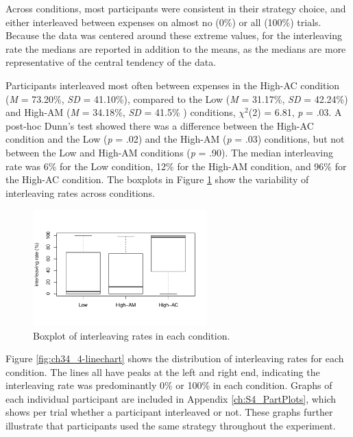 Across conditions, most participants were consistent in their strategy choice, and either interleaved between expenses on almost no (0\%) or all (100\%) trials. Because the data was centered around these extreme values, for the interleaving rate the medians are reported in addition to the means, as the medians are more representative of the central tendency of the data.


Participants interleaved most often between expenses in the High-AC condition (\textit{M} = 73.20\%, \textit{SD} = 41.10\%), compared to the Low (\textit{M} = 31.17\%, \textit{SD} = 42.24\%) and High-AM (\textit{M} = 34.18\%, \textit{SD} = 41.5\% ) conditions, $\chi^2$(2) = 6.81, \textit{p} = .03. A post-hoc Dunn's test showed there was a difference between the High-AC condition and the Low (\textit{p} = .02) and the High-AM (\textit{p} = .03) conditions, but not between the Low and High-AM conditions (\textit{p} = .90). The median interleaving rate was 6\% for the Low condition, 12\% for the High-AM condition, and 96\% for the High-AC condition. The boxplots in Figure \ref{fig:ch34_4-boxplots} show the variability of interleaving rates across conditions. 

\begin{figure}
 \includegraphics[width=0.6\textwidth]{images/ch34/ch4_4-boxplot.pdf}
\caption[Study 4 boxplot of interleaving rates]{Boxplot of interleaving rates in each condition.}
\label{fig:ch34_4-boxplots}
\end{figure}

Figure \ref{fig:ch34_4-linechart} shows the distribution of interleaving rates for each condition. The lines all have peaks at the left and right end, indicating the interleaving rate was predominantly 0\% or 100\% in each condition. Graphs of each individual participant are included in Appendix \ref{ch:S4_PartPlots}, which shows per trial whether a participant interleaved or not. These graphs further illustrate that participants used the same strategy throughout the experiment.

